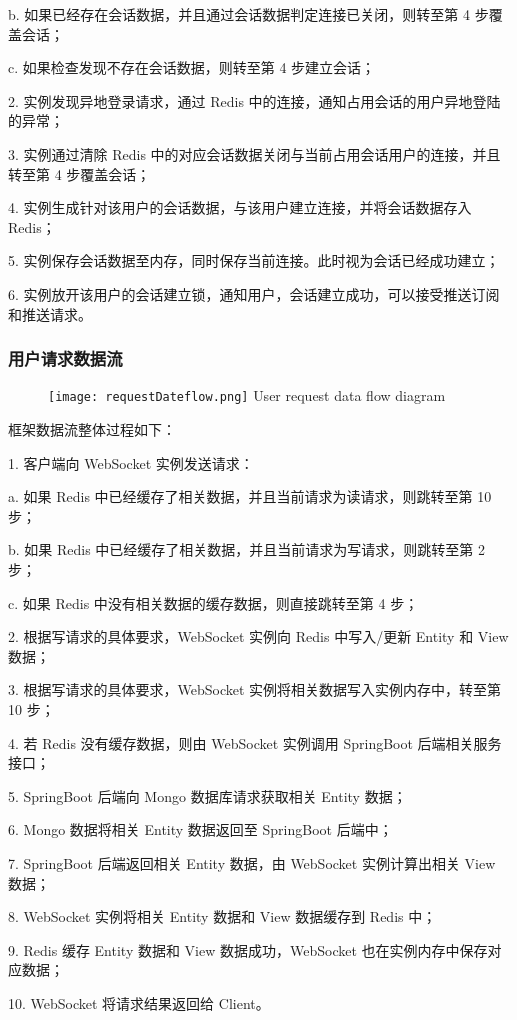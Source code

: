 \quad{}b. 如果已经存在会话数据，并且通过会话数据判定连接已关闭，则转至第 4 步覆盖会话；

\quad{}c. 如果检查发现不存在会话数据，则转至第 4 步建立会话；

2. 实例发现异地登录请求，通过 Redis 中的连接，通知占用会话的用户异地登陆的异常；

3. 实例通过清除 Redis 中的对应会话数据关闭与当前占用会话用户的连接，并且转至第 4 步覆盖会话；

4. 实例生成针对该用户的会话数据，与该用户建立连接，并将会话数据存入 Redis；

5. 实例保存会话数据至内存，同时保存当前连接。此时视为会话已经成功建立；

6. 实例放开该用户的会话建立锁，通知用户，会话建立成功，可以接受推送订阅和推送请求。
\subsubsection{用户请求数据流}
\begin{figure}[!htp]
  \centering
  \texttt{[image: requestDateflow.png]}
    {User request data flow diagram}
 \label{fig:requestDateflow}
\end{figure}
框架数据流整体过程如下：

1. 客户端向 WebSocket 实例发送请求：

\quad{}a. 如果 Redis 中已经缓存了相关数据，并且当前请求为读请求，则跳转至第 10 步；

\quad{}b. 如果 Redis 中已经缓存了相关数据，并且当前请求为写请求，则跳转至第 2 步；

\quad{}c. 如果 Redis 中没有相关数据的缓存数据，则直接跳转至第 4 步；

2. 根据写请求的具体要求，WebSocket 实例向 Redis 中写入/更新 Entity 和 View数据；

3. 根据写请求的具体要求，WebSocket 实例将相关数据写入实例内存中，转至第 10 步；

4. 若 Redis 没有缓存数据，则由 WebSocket 实例调用 SpringBoot 后端相关服务接口；

5. SpringBoot 后端向 Mongo 数据库请求获取相关 Entity 数据；

6. Mongo 数据将相关 Entity 数据返回至 SpringBoot 后端中；

7. SpringBoot 后端返回相关 Entity 数据，由 WebSocket 实例计算出相关 View 数据；

8. WebSocket 实例将相关 Entity 数据和 View 数据缓存到 Redis 中；

9. Redis 缓存 Entity 数据和 View 数据成功，WebSocket 也在实例内存中保存对应数据；

10. WebSocket 将请求结果返回给 Client。